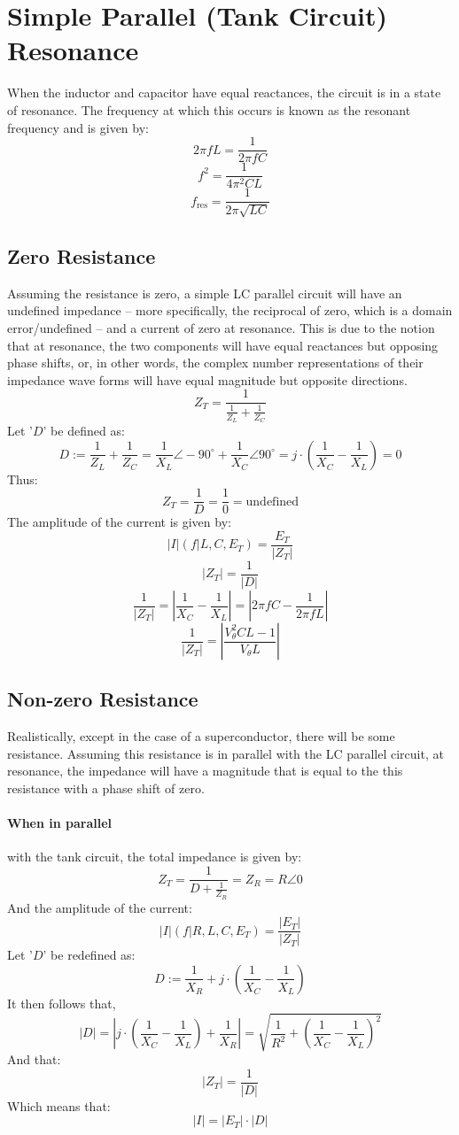 \documentclass{article}
\begin{document}
	\section[Parallel]{Simple Parallel (Tank Circuit) Resonance }
	When the inductor and capacitor have equal reactances, the circuit is in a 
	state of resonance.  The frequency at which this occurs is known as the 
	resonant frequency and is given by:
	$$ 2 \pi f L = \frac{1}{2 \pi f C}$$ 
	$$ f^2 = \frac{1}{4\pi ^2 C L}$$
	\begin{equation}\label{eq:res-freq}
	f_{\text{res}}=\frac{1}{2\pi \sqrt{LC}}
	\end{equation}
	\subsection[ZeroR]{Zero Resistance}
	Assuming the resistance is zero, a simple LC parallel circuit will have an 
	undefined impedance -- more specifically, the reciprocal of zero, which is 
	a domain error/undefined -- and a current of zero at resonance.  This is 
	due to the notion that at resonance, the two components will have equal 
	reactances but opposing phase shifts, or, in other words, the complex 
	number representations of their impedance wave forms will have equal 
	magnitude but opposite directions.
	$$ Z_T = \frac{1}{\frac{1}{Z_L} + \frac{1}{Z_C}}$$
	Let '$D$' be defined as:
	$$ D := \frac{1}{Z_L} + \frac{1}{Z_C} = \frac{1}{X_L}\angle-90^{\circ} + 
	\frac{1}{X_C}\angle90^{\circ} = j \cdot \left(\frac{1}{X_C} - \frac{1}{X_L} 
	\right) = 
	0$$
	Thus:
	$$ Z_T = \frac{1}{D} = \frac{1}{0} = \text{undefined}$$
	The amplitude of the current is given by:
	$$ |I|(f \vert L, C, E_T) = \frac{E_T}{|Z_T|}$$
	$$ |Z_T| = \frac{1}{|D|} $$
	$$ \frac{1}{|Z_T|} = \left| \frac{1}{X_C} - \frac{1}{X_L}\right | = \left| 
	2\pi f C - 
	\frac{1}{2 \pi f L} \right |$$
	$$ \frac{1}{|Z_T|} = \left | \frac{V_\theta^2 CL - 1}{V_\theta L} \right|$$
	\subsection[NonZeroR]{Non-zero Resistance}
	Realistically, except in the case of a superconductor, there will be some 
	resistance.  Assuming this resistance is in parallel with the LC parallel 
	circuit, at resonance, the impedance will have a magnitude that is 
	equal to the this resistance with a phase shift of zero.
	\paragraph[In Parallel]{When in parallel} with the tank circuit, the total 
	impedance is given by:
	$$ Z_T = \frac{1}{D + \frac{1}{Z_R}} = Z_R = R\angle0$$
	And the amplitude of the current:
	$$ |I|(f\vert R, L, C, E_T) = \frac{|E_T|}{|Z_T|}$$
	Let '$D$' be redefined as:
	$$ D := \frac{1}{X_R} + j \cdot \left( \frac{1}{X_C} - 
	\frac{1}{X_L}\right)$$
	It then follows that,
	$$|D| = \left|j \cdot \left( \frac{1}{X_C} - \frac{1}{X_L}\right) + 
	\frac{1}{X_R}\right|=\sqrt{\frac{1}{R^2} + \left( \frac{1}{X_C} - 
	\frac{1}{X_L} \right)^2}$$
	And that:
	$$ |Z_T| = \frac{1}{|D|}$$
	Which means that:
	$$ |I| = |E_T| \cdot |D|$$
\end{document}
